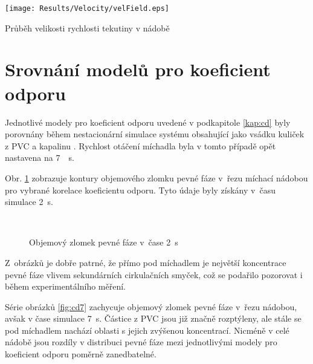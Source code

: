 \begin{grf}[h!]
 \centering
  \texttt{[image: Results/Velocity/velField.eps]}
  \caption{Průběh velikosti rychlosti tekutiny v nádobě}
  \label{grf:velfield}
\end{grf}

\section{Srovnání modelů pro koeficient odporu}
Jednotlivé modely pro koeficient odporu uvedené v podkapitole \ref{kap:cd} byly porovnány během nestacionární simulace systému obsahující jako vsádku  kuliček z PVC a kapalinu \pvpP. Rychlost otáčení míchadla byla v tomto případě opět nastavena na \SI{7}{\per\second}.

Obr. \ref{fig:cd2} zobrazuje kontury objemového zlomku pevné fáze v~řezu míchací nádobou pro vybrané korelace koeficientu odporu. Tyto údaje byly získány v~času simulace \SI{2}{\second}. 
\begin{figure}[h!]
 \centering

  \qquad             
  \\
  \qquad
  \caption{Objemový zlomek pevné fáze v~čase \SI{2}{\second}}
  \label{fig:cd2}
\end{figure}
\newpage
\noindent Z~obrázků je dobře patrné, že přímo pod míchadlem je největší koncentrace pevné fáze vlivem sekundárních cirkulačních smyček, což se podařilo pozorovat i během experimentálního měření.

Série obrázků \ref{fig:cd7} zachycuje objemový zlomek pevné fáze v~řezu nádobou, avšak v čase simulace \SI{7}{\second}. Částice z PVC jsou již značně rozptýleny, ale stále se pod míchadlem nachází oblasti s jejich zvýšenou koncentrací. Nicméně v celé nádobě jsou rozdíly v distribuci pevné fáze mezi jednotlivými modely pro koeficient odporu poměrně zanedbatelné.

